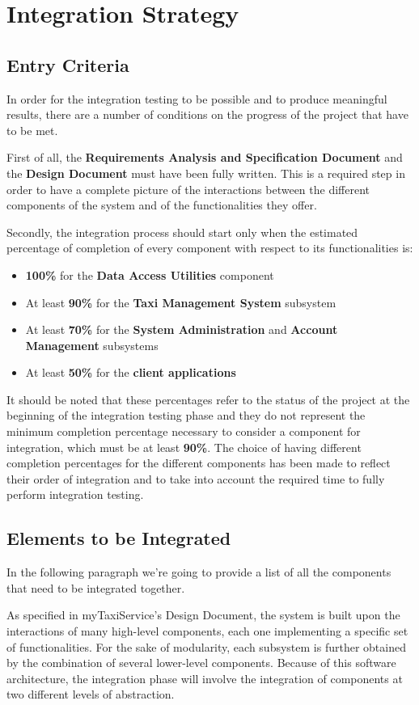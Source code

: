 \chapter{Integration Strategy}
\section{Entry Criteria}
In order for the integration testing to be possible and to produce meaningful results, there are a number of conditions on the progress of the project that have to be met.

First of all, the \textbf{Requirements Analysis and Specification Document} and the \textbf{Design Document} must have been fully written. This is a required step in order to have a complete picture of the interactions between the different components of the system and of the functionalities they offer. 

Secondly, the integration process should start only when the estimated percentage of completion of every component with respect to its functionalities is:
\begin{itemize}
	\item \textbf{100\%} for the \textbf{Data Access Utilities} component
	\item At least \textbf{90\%} for the \textbf{Taxi Management System} subsystem
	\item At least \textbf{70\%} for the \textbf{System Administration} and \textbf{Account Management} subsystems
	\item At least \textbf{50\%} for the \textbf{client applications}
\end{itemize} 
It should be noted that these percentages refer to the status of the project at the beginning of the integration testing phase and they do not represent the minimum completion percentage necessary to consider a component for integration, which must be at least \textbf{90\%}. The choice of having different completion percentages for the different components has been made to reflect their order of integration and to take into account the required time to fully perform integration testing.

\section{Elements to be Integrated}
In the following paragraph we're going to provide a list of all the components that need to be integrated together.

As specified in myTaxiService's Design Document, the system is built upon the interactions of many high-level components, each one implementing a specific set of functionalities. For the sake of modularity, each subsystem is further obtained by the combination of several lower-level components.
Because of this software architecture, the integration phase will involve the integration of components at two different levels of abstraction. 

